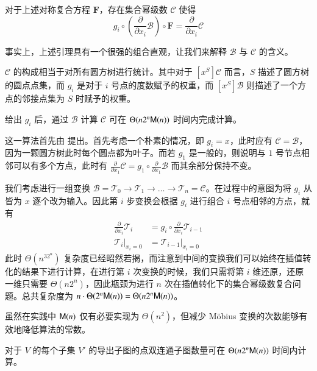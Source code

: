 \begin{lemma}
对于上述对称复合方程 $\mathbf F$，存在集合幂级数 $\mathscr C$ 使得
$$
g_i \circ \left(\frac{\partial}{\partial x_i}\mathscr B\right)\circ \mathbf F = \frac{\partial}{\partial x_i} \mathscr C
$$
\end{lemma}

事实上，上述引理具有一个很强的组合直观，让我们来解释 $\mathscr B$ 与 $\mathscr C$ 的含义。

$\mathscr C$ 的构成相当于对所有圆方树进行统计。其中对于 $[x^S]\mathscr C$ 而言，$S$ 描述了圆方树的圆点点集，而 $g_i$ 是对于 $i$ 号点的度数赋予的权重，而 $[x^S]\mathscr B$ 则描述了一个方点的邻接点集为 $S$ 时赋予的权重。

\begin{theorem} \label{algosymmcomp}
给出 $g_i$ 后，通过 $\mathscr B$ 计算 $\mathscr C$ 可在 $\Theta(n2^n\mathsf M(n))$ 时间内完成计算。
\end{theorem}

这一算法首先由 \cite{b2c} 提出。首先考虑一个朴素的情况，即 $g_i = x$，此时应有 $\mathscr C = \mathscr B$，因为一颗圆方树此时每个圆点都为叶子。而若 $g_1$ 是一般的，则说明与 $1$ 号节点相邻可以有多个方点，此时有 $\frac{\partial}{\partial x_1} \mathscr C = g_1 \circ \frac{\partial}{\partial x_1}\mathscr B$ 而其余部分保持不变。

我们考虑进行一组变换 $\mathscr B = \mathscr T_0 \rightarrow \mathscr T_1\rightarrow \dots \rightarrow \mathscr T_n = \mathscr C$。在过程中的意图为将 $g_i$ 从皆为 $x$ 逐个改为输入。因此第 $i$ 步变换会根据 $g_i$ 进行组合 $i$ 号点相邻的方点，就有
\begin{align*}
\frac{\partial}{\partial x_i} \mathscr T_{i} &= g_i \circ \frac{\partial}{\partial x_i}\mathscr T_{i-1}\\
\left.\mathscr T_i\right|_{x_i=0} &= \left.\mathscr T_{i-1}\right|_{x_i=0}
\end{align*}
此时 $\Theta(n^32^n)$ 复杂度已经昭然若揭，而注意到中间的变换我们可以始终在插值转化的结果下进行计算，在进行第 $i$ 次变换的时候，我们只需将第 $i$ 维还原，还原一维只需要 $\Theta(n2^n)$，因此瓶颈为进行 $n$ 次在插值转化下的集合幂级数复合问题。总共复杂度为 $n\cdot \Theta(2^n\mathsf M(n)) = \Theta(n2^n\mathsf M(n))$。

虽然在实践中 $\mathsf M(n)$ 仅有必要实现为 $\Theta(n^2)$，但减少 M\"obius 变换的次数能够有效地降低算法的常数。

\begin{lemma}
对于 $V$ 的每个子集 $V'$ 的导出子图的点双连通子图数量可在 $\Theta(n2^n\mathsf M(n))$ 时间内计算。
\end{lemma}

